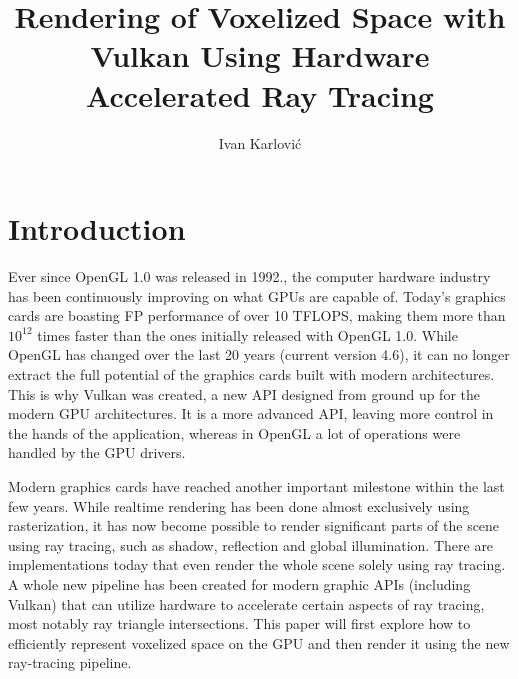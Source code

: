 \documentclass[times, utf8, zavrsni, numeric]{fer}
\begin{document}

\title{Rendering of Voxelized Space with Vulkan Using Hardware Accelerated Ray Tracing}

\author{Ivan Karlović}

\maketitle

\izvornik

\zahvala{}

\tableofcontents

\chapter{Introduction}

Ever since OpenGL 1.0 was released in 1992., the computer hardware industry has been continuously improving on what GPUs are capable of. Today's graphics cards are boasting FP performance of over 10 TFLOPS, making them more than $10^{12}$ times faster than the ones initially released with OpenGL 1.0. While OpenGL has changed over the last 20 years (current version 4.6), it can no longer extract the full potential of the graphics cards built with modern architectures. This is why Vulkan was created, a new API designed from ground up for the modern GPU architectures. It is a more advanced API, leaving more control in the hands of the application, whereas in OpenGL a lot of operations were handled by the GPU drivers.

Modern graphics cards have reached another important milestone within the last few years. While realtime rendering has been done almost exclusively using rasterization, it has now become possible to render significant parts of the scene using ray tracing, such as shadow, reflection and global illumination. There are implementations today that even render the whole scene solely using ray tracing. A whole new pipeline has been created for modern graphic APIs (including Vulkan) that can utilize hardware to accelerate certain aspects of ray tracing, most notably ray triangle intersections. This paper will first explore how to efficiently represent voxelized space on the GPU and then render it using the new ray-tracing pipeline.
\end{document}
